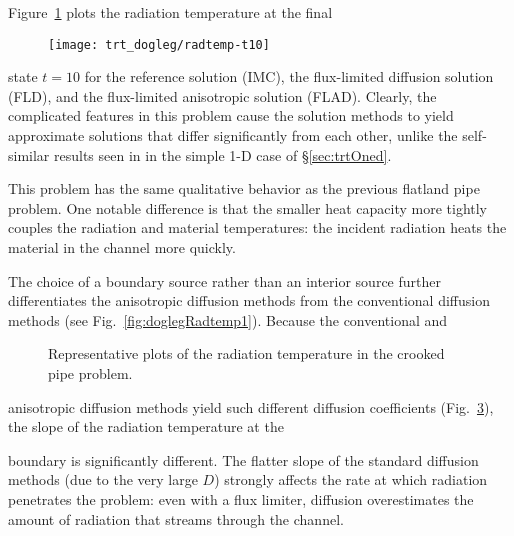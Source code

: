 Figure~\ref{fig:doglegRadtempFinal} plots the radiation temperature at the final
%
\begin{figure}[htb]
  \centering
  \texttt{[image: trt\_dogleg/radtemp-t10]}
  \label{fig:doglegRadtempFinal}
\end{figure}
%
state $t=10$ for the reference solution (IMC), the flux-limited diffusion
solution (FLD), and the flux-limited anisotropic solution (FLAD). Clearly, the
complicated features in this problem cause the solution
methods to yield approximate solutions that differ significantly from each
other, unlike the self-similar results seen in in the simple 1-D case of
\S\ref{sec:trtOned}.

This problem has the same qualitative behavior as the previous flatland pipe
problem. One notable difference is that the smaller heat capacity more tightly
couples the radiation and material temperatures: the incident radiation heats
the material in the channel more quickly.

The choice of a boundary source rather than an interior source further
differentiates the anisotropic diffusion methods from the conventional diffusion
methods (see Fig.~\ref{fig:doglegRadtemp1}). Because the conventional and
%
\begin{figure}[htb]
  \centering\small
  \subfloat[Leg 1 at $t=0.5$]{%
    \hspace{-.25in}%
    
    \label{fig:doglegRadtemp1}
  }%
  \subfloat[Leg 2 at $t=2.0$]{%
    \hspace{-.25in}%
    
    \label{fig:doglegRadtemp2}
  }%
  \caption{Representative plots of the radiation temperature in the crooked
  pipe problem.}
  \label{fig:doglegRadtemp}
\end{figure}
%
anisotropic diffusion methods yield such different diffusion coefficients
(Fig.~\ref{fig:doglegDcoeff}), the slope of the radiation temperature at the
%
\begin{figure}[htb]
  \centering\small
  \subfloat[Leg 1]{%
    \hspace{-.25in}%
    
  }%
  \subfloat[Leg 2]{%
    \hspace{-.25in}%
    
  }%
  \label{fig:doglegDcoeff}
\end{figure}
%
boundary is significantly different. The flatter slope of the standard
diffusion methods (due to the very large $D$) strongly affects the rate at which
radiation penetrates the problem: even with a flux limiter, diffusion
overestimates the amount of radiation that streams through the channel.

